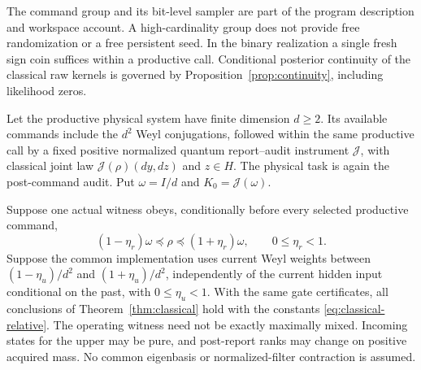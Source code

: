 The command group and its bit-level sampler are part of the program description and workspace account. A high-cardinality group does not provide free randomization or a free persistent seed. In the binary realization a single fresh sign coin suffices within a productive call. Conditional posterior continuity of the classical raw kernels is governed by Proposition~\ref{prop:continuity}, including likelihood zeros.

\begin{theorem}\label{thm:quantum}
Let the productive physical system have finite dimension $d\ge2$. Its available commands include the $d^2$ Weyl conjugations, followed within the same productive call by a fixed positive normalized quantum report--audit instrument $\mathcal J$, with classical joint law $\mathcal J(\rho)(dy,dz)$ and $z\in H$. The physical task is again the post-command audit. Put $\omega=I/d$ and $K_0=\mathcal J(\omega)$.

Suppose one actual witness obeys, conditionally before every selected productive command,
\[
 (1-\eta_r)\omega\preccurlyeq\rho\preccurlyeq(1+\eta_r)\omega,
 \qquad0\le\eta_r<1.
\]
Suppose the common implementation uses current Weyl weights between $(1-\eta_u)/d^2$ and $(1+\eta_u)/d^2$, independently of the current hidden input conditional on the past, with $0\le\eta_u<1$. With the same gate certificates, all conclusions of Theorem~\ref{thm:classical} hold with the constants \eqref{eq:classical-relative}. The operating witness need not be exactly maximally mixed. Incoming states for the upper may be pure, and post-report ranks may change on positive acquired mass. No common eigenbasis or normalized-filter contraction is assumed.
\end{theorem}
